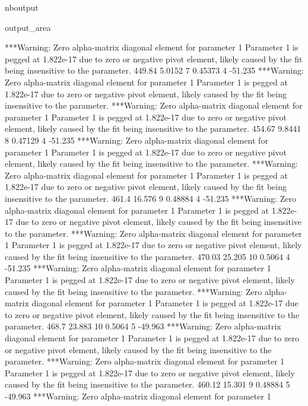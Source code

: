 \documentclass[letterpaper,10pt,english]{sphinxmanual}
\begin{document}
\begin{sphinxuseclass}{nboutput}
{\begin{sphinxuseclass}{output_area}
\begin{sphinxuseclass}{}
\begin{sphinxVerbatim}[commandchars=\\\{\}]
***Warning: Zero alpha-matrix diagonal element for parameter 1
 Parameter 1 is pegged at 1.822e-17 due to zero or negative pivot element, likely
 caused by the fit being insensitive to the parameter.
          449.84      5.0152    7     0.45373    4     -51.235
***Warning: Zero alpha-matrix diagonal element for parameter 1
 Parameter 1 is pegged at 1.822e-17 due to zero or negative pivot element, likely
 caused by the fit being insensitive to the parameter.
***Warning: Zero alpha-matrix diagonal element for parameter 1
 Parameter 1 is pegged at 1.822e-17 due to zero or negative pivot element, likely
 caused by the fit being insensitive to the parameter.
          454.67      9.8441    8     0.47129    4     -51.235
***Warning: Zero alpha-matrix diagonal element for parameter 1
 Parameter 1 is pegged at 1.822e-17 due to zero or negative pivot element, likely
 caused by the fit being insensitive to the parameter.
***Warning: Zero alpha-matrix diagonal element for parameter 1
 Parameter 1 is pegged at 1.822e-17 due to zero or negative pivot element, likely
 caused by the fit being insensitive to the parameter.
           461.4      16.576    9     0.48884    4     -51.235
***Warning: Zero alpha-matrix diagonal element for parameter 1
 Parameter 1 is pegged at 1.822e-17 due to zero or negative pivot element, likely
 caused by the fit being insensitive to the parameter.
***Warning: Zero alpha-matrix diagonal element for parameter 1
 Parameter 1 is pegged at 1.822e-17 due to zero or negative pivot element, likely
 caused by the fit being insensitive to the parameter.
          470.03      25.205   10      0.5064    4     -51.235
***Warning: Zero alpha-matrix diagonal element for parameter 1
 Parameter 1 is pegged at 1.822e-17 due to zero or negative pivot element, likely
 caused by the fit being insensitive to the parameter.
***Warning: Zero alpha-matrix diagonal element for parameter 1
 Parameter 1 is pegged at 1.822e-17 due to zero or negative pivot element, likely
 caused by the fit being insensitive to the parameter.
           468.7      23.883   10      0.5064    5     -49.963
***Warning: Zero alpha-matrix diagonal element for parameter 1
 Parameter 1 is pegged at 1.822e-17 due to zero or negative pivot element, likely
 caused by the fit being insensitive to the parameter.
***Warning: Zero alpha-matrix diagonal element for parameter 1
 Parameter 1 is pegged at 1.822e-17 due to zero or negative pivot element, likely
 caused by the fit being insensitive to the parameter.
          460.12      15.301    9     0.48884    5     -49.963
***Warning: Zero alpha-matrix diagonal element for parameter 1

\end{sphinxVerbatim}
\end{sphinxuseclass}
\end{sphinxuseclass}}
\end{sphinxuseclass}
\end{document}
